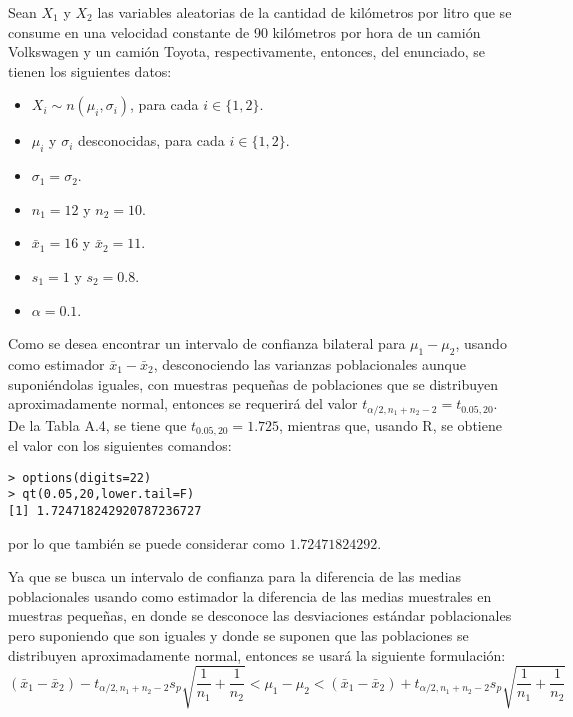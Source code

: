 \begin{solucion}
 Sean $X_1$ y $X_2$ las variables aleatorias de la cantidad de kil\'ometros por litro que se consume en una velocidad constante de 90 kil\'ometros por hora de un cami\'on Volkswagen y un cami\'on Toyota, respectivamente, entonces, del enunciado, se tienen los siguientes datos:
 \begin{itemize}
  \item $X_i \sim n(\mu_i,\sigma_i)$, para  cada $i \in \{ 1,2 \}$.
  \item $\mu_i$ y $\sigma_i$ desconocidas, para cada $i \in \{ 1, 2 \}$.
  \item $\sigma_1 = \sigma_2$.
  \item $n_1 = 12$ y $n_2 = 10$.
  \item $\bar{x}_1 = 16$ y $\bar{x}_2 = 11$.
  \item $s_1 = 1$ y $s_2 = 0.8$.
  \item $\alpha = 0.1$.
 \end{itemize}
 Como se desea encontrar un intervalo de confianza bilateral para $\mu_1 - \mu_2$, usando como estimador $\bar{x}_1 - \bar{x}_2$, desconociendo las varianzas poblacionales aunque suponi\'endolas iguales, con muestras peque\~nas de poblaciones que se distribuyen aproximadamente normal, entonces se requerir\'a del valor $t_{\alpha/2,n_1+n_2-2} = t_{0.05,20}$. De la Tabla A.4, se tiene que $t_{0.05,20} = 1.725$, mientras que, usando R, se obtiene el valor con los siguientes comandos:
 \begin{verbatim}
> options(digits=22)
> qt(0.05,20,lower.tail=F)
[1] 1.724718242920787236727
 \end{verbatim}
 \vspace{-0.5cm}
 por lo que tambi\'en se puede considerar como $1.72471824292$.
 \par 
 Ya que se busca un intervalo de confianza para la diferencia de las medias poblacionales usando como estimador la diferencia de las medias muestrales en muestras peque\~nas, en donde se desconoce las desviaciones est\'andar poblacionales pero suponiendo que son iguales y donde se suponen que las poblaciones se distribuyen aproximadamente normal, entonces se usar\'a la siguiente formulaci\'on:
 \begin{equation*}
  \left( \bar{x}_1 - \bar{x}_2 \right) - t_{\alpha/2,n_1+n_2-2} s_p \sqrt{\frac{1}{n_1} + \frac{1}{n_2}} < \mu_1 - \mu_2 < \left( \bar{x}_1 - \bar{x}_2 \right) + t_{\alpha/2,n_1+n_2-2} s_p \sqrt{\frac{1}{n_1} + \frac{1}{n_2}}
 \end{equation*}

\end{solucion}
